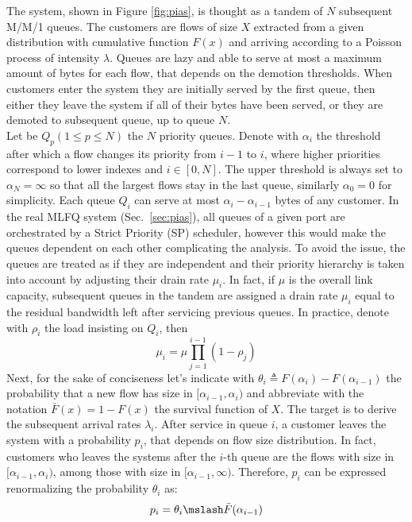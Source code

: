 The system, shown in Figure \ref{fig:pias}, is thought as a tandem of $N$ subsequent M/M/1 queues.  The customers are flows of size $X$ extracted from a given distribution with cumulative function $F(x)$ and arriving according to a Poisson process of intensity $\lambda$. Queues are lazy and able to serve at most a maximum amount of bytes for each flow, that depends on the demotion thresholds. When customers enter the system they are initially served by the first queue, then either they leave the system if all of their bytes have been served, or they are demoted to subsequent queue, up to queue $N$. \\ 
Let be $Q_p(1 \le p \le N)$ the $N$ priority queues. Denote with $\alpha_i$ the threshold after which a flow changes its priority from $i-1$ to $i$, where higher priorities correspond to lower indexes and $i \in [0,N]$. The upper threshold is always set to $\alpha_N = \infty$ so that all the largest flows stay in the last queue, similarly $\alpha_0 = 0$ for simplicity. Each queue $Q_i$ can serve at most $\alpha_i - \alpha_{i-1}$ bytes of any customer. In the real MLFQ system (Sec.~\ref{sec:pias}), all queues of a given port are orchestrated by a Strict Priority (SP) scheduler, however this would make the queues dependent on each other complicating the analysis. To avoid the issue, the queues are treated as if they are independent and their priority hierarchy is taken into account by adjusting their drain rate $\mu_i$. In fact, if $\mu$ is the overall link capacity, subsequent queues in the tandem are assigned a drain rate $\mu_i$ equal to the residual bandwidth left after servicing previous queues. In practice, denote with $\rho_i$ the load insisting on $Q_i$, then 
\begin{equation}
\mu_i = \mu \prod_{j=1}^{i-1} (1-\rho_j)
\end{equation}
Next, for the sake of conciseness let's indicate with $\theta_i \triangleq F(\alpha_{i}) - F(\alpha_{i-1})$ the probability that a new flow has size in $[\alpha_{i-1}, \alpha_{i})$ and abbreviate with the notation $\bar{F}(x) = 1 - F(x)$ the survival function of $X$. The target is to derive the subsequent arrival rates $\lambda_i$.
After service in queue $i$, a customer leaves the system with a probability $p_i$, that depends on flow size distribution. In fact, customers who leaves the systems after the $i$-th queue are the flows with size in $[\alpha_{i-1}, \alpha_{i})$, among those with size in $[\alpha_{i-1}, \infty)$. Therefore, $p_i$ can be expressed renormalizing the probability $\theta_i$ as:
\[
p_i = \theta_i \mslash \bar{F}(\alpha_{i-1})
\]
